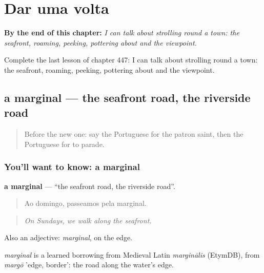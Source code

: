 
\chapter{Dar uma volta}
\label{ch:pt-dar-uma-volta}

\begin{chapteropening}
\textbf{By the end of this chapter:} \emph{I can talk about strolling round a town: the seafront, roaming, peeking, pottering about and the viewpoint.}

Complete the last lesson of chapter 447: I can talk about strolling round a town: the seafront, roaming, peeking, pottering about and the viewpoint.
\end{chapteropening}

\section[a marginal]{a marginal — the seafront road, the riverside road}

\label{lesson:PT-C447-marginal}



\begin{quote}
Before the new one: say the Portuguese for the patron saint, then the Portuguese for to parade.
\end{quote}

\subsection*{You'll want to know: a marginal}
\textbf{a marginal} — \textquotedblleft{}the seafront road, the riverside road\textquotedblright{}.

\begin{quote}
Ao domingo, passeamos pela marginal.
\end{quote}

\begin{quote}
\emph{On Sundays, we walk along the seafront.}
\end{quote}

Also an adjective: \emph{marginal}, on the edge.

\begin{cousinweb}
\emph{marginal} is a learned borrowing from Medieval Latin \emph{marginālis} (EtymDB), from \emph{margō} 'edge, border': the road along the water's edge.
\end{cousinweb}


